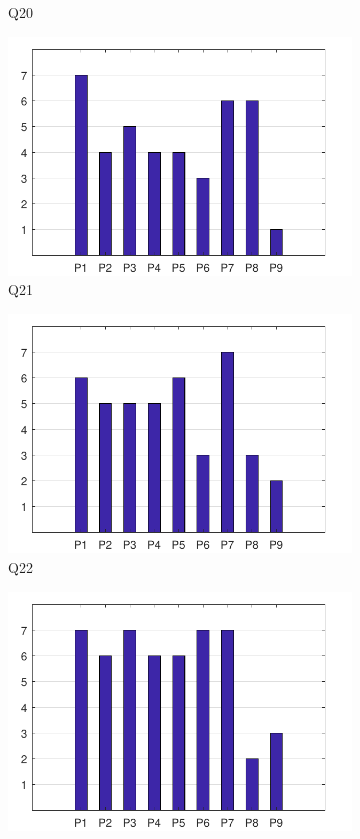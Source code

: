 \documentclass[english, 12pt, a4paper, pdftex, elec, utf8]{aaltothesis}
\begin{document}
\begin{figure}[h!]
\begin{subfigure}[b]{0.49\textwidth}
		\caption*{Q20}
	\end{subfigure}
	\begin{subfigure}[b]{0.49\textwidth}
		\includegraphics[width=\textwidth]{T2_12.pdf}
		\caption*{Q21}
	\end{subfigure}
	\begin{subfigure}[b]{0.49\textwidth}
		\includegraphics[width=\textwidth]{T2_13.pdf}
		\caption*{Q22}
	\end{subfigure}
	\begin{subfigure}[b]{0.49\textwidth}
		\includegraphics[width=\textwidth]{T2_14.pdf}

\end{subfigure}
\end{figure}
\end{document}
